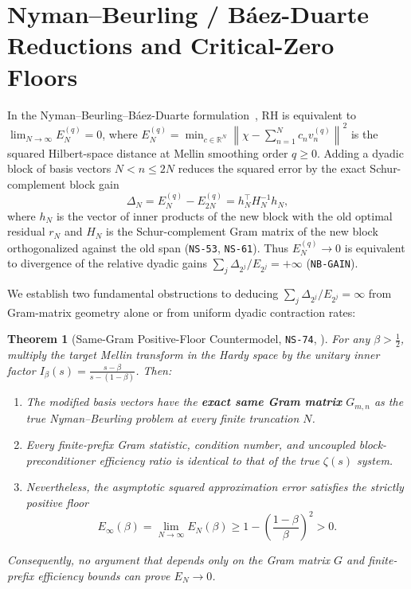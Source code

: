 \documentclass[11pt]{article}
\newtheorem{theorem}{Theorem}[section]
\theoremstyle{remark}
\newcommand{\norm}[1]{\left\lVert #1\right\rVert}
\begin{document}
\section{Nyman--Beurling / B\'aez-Duarte Reductions and Critical-Zero Floors}
\label{sec:nb}

In the Nyman--Beurling--B\'aez-Duarte formulation~\cite{BaezDuarteStrong,BurnolLower2002}, RH is equivalent to $\lim_{N\to\infty} E_N^{(q)} = 0$, where $E_N^{(q)} = \min_{c \in \mathbb{R}^N} \norm{\chi - \sum_{n=1}^N c_n v_n^{(q)}}^2$ is the squared Hilbert-space distance at Mellin smoothing order $q \ge 0$. Adding a dyadic block of basis vectors $N < n \le 2N$ reduces the squared error by the exact Schur-complement block gain
\begin{equation}\label{eq:nb-schur-gain}
  \Delta_N = E_N^{(q)} - E_{2N}^{(q)} = h_N^\top H_N^{-1} h_N,
\end{equation}
where $h_N$ is the vector of inner products of the new block with the old optimal residual $r_N$ and $H_N$ is the Schur-complement Gram matrix of the new block orthogonalized against the old span (\texttt{NS-53}, \texttt{NS-61}). Thus $E_N^{(q)} \to 0$ is equivalent to divergence of the relative dyadic gains $\sum_j \Delta_{2^j} / E_{2^j} = +\infty$ (\texttt{NB-GAIN}).

We establish two fundamental obstructions to deducing $\sum_j \Delta_{2^j}/E_{2^j} = \infty$ from Gram-matrix geometry alone or from uniform dyadic contraction rates:

\begin{theorem}[Same-Gram Positive-Floor Countermodel, \texttt{NS-74}, ]
\label{thm:nb-same-gram}
For any $\beta > \tfrac{1}{2}$, multiply the target Mellin transform in the Hardy space by the unitary inner factor $I_\beta(s) = \frac{s - \beta}{s - (1 - \beta)}$. Then:
\begin{enumerate}[label=(\roman*)]
  \item The modified basis vectors have the \textbf{exact same Gram matrix} $G_{m,n}$ as the true Nyman--Beurling problem at every finite truncation $N$.
  \item Every finite-prefix Gram statistic, condition number, and uncoupled block-preconditioner efficiency ratio is identical to that of the true $\zeta(s)$ system.
  \item Nevertheless, the asymptotic squared approximation error satisfies the strictly positive floor
  \begin{equation}
    E_\infty(\beta) = \lim_{N\to\infty} E_N(\beta) \ge 1 - \left(\frac{1-\beta}{\beta}\right)^2 > 0.
  \end{equation}
\end{enumerate}
Consequently, no argument that depends only on the Gram matrix $G$ and finite-prefix efficiency bounds can prove $E_N \to 0$.
\end{theorem}
\end{document}
